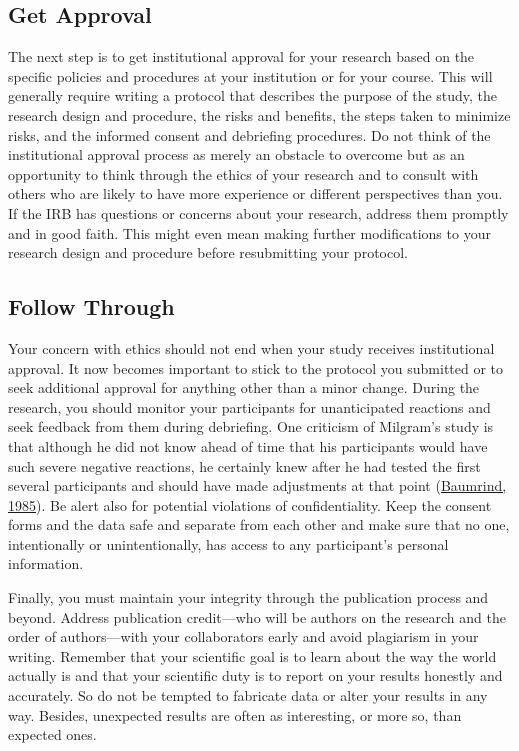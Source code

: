 \documentclass[
]{krantz}
\begin{document}
\hypertarget{get-approval}{%
\subsection*{Get Approval}\label{get-approval}}


The next step is to get institutional approval for your research based on the specific policies and procedures at your institution or for your course. This will generally require writing a protocol that describes the purpose of the study, the research design and procedure, the risks and benefits, the steps taken to minimize risks, and the informed consent and debriefing procedures. Do not think of the institutional approval process as merely an obstacle to overcome but as an opportunity to think through the ethics of your research and to consult with others who are likely to have more experience or different perspectives than you. If the IRB has questions or concerns about your research, address them promptly and in good faith. This might even mean making further modifications to your research design and procedure before resubmitting your protocol.

\hypertarget{follow-through}{%
\subsection*{Follow Through}\label{follow-through}}


Your concern with ethics should not end when your study receives institutional approval. It now becomes important to stick to the protocol you submitted or to seek additional approval for anything other than a minor change. During the research, you should monitor your participants for unanticipated reactions and seek feedback from them during debriefing. One criticism of Milgram's study is that although he did not know ahead of time that his participants would have such severe negative reactions, he certainly knew after he had tested the first several participants and should have made adjustments at that point (\protect\hyperlink{ref-baumrind1985research}{Baumrind, 1985}). Be alert also for potential violations of confidentiality. Keep the consent forms and the data safe and separate from each other and make sure that no one, intentionally or unintentionally, has access to any participant's personal information.

Finally, you must maintain your integrity through the publication process and beyond. Address publication credit---who will be authors on the research and the order of authors---with your collaborators early and avoid plagiarism in your writing. Remember that your scientific goal is to learn about the way the world actually is and that your scientific duty is to report on your results honestly and accurately. So do not be tempted to fabricate data or alter your results in any way. Besides, unexpected results are often as interesting, or more so, than expected ones.
\end{document}
